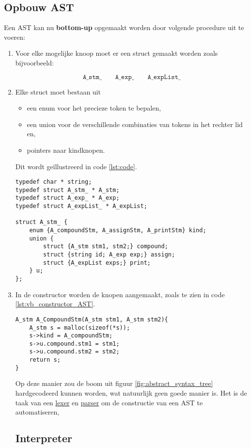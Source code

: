 \subsection{Opbouw AST}
Een AST kan nu \textbf{bottom-up} opgemaakt worden door volgende procedure uit te voeren:
\begin{enumerate}
	\item Voor elke mogelijke knoop moet er een struct gemaakt worden zoals bijvoorbeeld:
	
	$$\texttt{A\_stm\_} \qquad \texttt{A\_exp\_} \qquad \texttt{A\_expList\_}$$
	
	\item Elke struct moet bestaan uit
	\begin{itemize}
		\item een enum voor het precieze token te bepalen,
		\item een union voor de verschillende combinaties van tokens in het rechter lid en,
		\item pointers naar kindknopen.
	\end{itemize}
	Dit wordt geïllustreerd in code \ref{lst:code}.
	\begin{lstlisting}[caption={Voorbeeld van een struct voor een AST.},label={lst:vb_struct_AST}, captionpos=b]
typedef char * string;
typedef struct A_stm_ * A_stm;
typedef struct A_exp_ * A_exp;
typedef struct A_expList_ * A_expList;

struct A_stm_ {
	enum {A_compoundStm, A_assignStm, A_printStm} kind;
	union {
		struct {A_stm stm1, stm2;} compound;
		struct {string id; A_exp exp;} assign;
		struct {A_expList exps;} print;
	} u;
};
	\end{lstlisting}
	\item In de constructor worden de knopen aangemaakt, zoals te zien in code \ref{lst:vb_constructor_AST}.
	\begin{lstlisting}[caption={Voorbeeld van een constructor voor een AST.},label={lst:vb_constructor_AST}, captionpos=b]
A_stm A_CompoundStm(A_stm stm1, A_stm stm2){
	A_stm s = malloc(sizeof(*s));
	s->kind = A_compoundStm;
	s->u.compound.stm1 = stm1;
	s->u.compound.stm2 = stm2;
	return s;
}
	\end{lstlisting}
	
Op deze manier zou de boom uit figuur \ref{fig:abstract_syntax_tree} hardgecodeerd kunnen worden, wat natuurlijk geen goede manier is. Het is de taak van een \uline{lexer} en \uline{parser} om de constructie van een AST te automatiseren, 

\subsection{Interpreter}

\end{enumerate}


